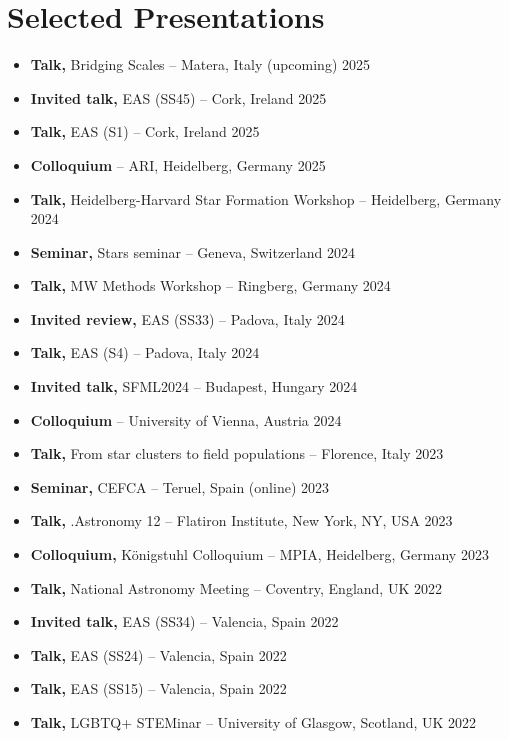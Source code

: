 \section*{Selected Presentations}

\begin{itemize}
    \item \textbf{Talk,} Bridging Scales -- Matera, Italy \hfill (upcoming) 2025
    \item \textbf{Invited talk,} EAS (SS45) -- Cork, Ireland \hfill 2025
    \item \textbf{Talk,} EAS (S1) -- Cork, Ireland \hfill 2025
    \item \textbf{Colloquium} -- ARI, Heidelberg, Germany \hfill 2025
    \item \textbf{Talk,} Heidelberg-Harvard Star Formation Workshop -- Heidelberg, Germany \hfill 2024
    \item \textbf{Seminar,} Stars seminar -- Geneva, Switzerland \hfill 2024
    \item \textbf{Talk,} MW Methods Workshop -- Ringberg, Germany \hfill 2024
    \item \textbf{Invited review,} EAS (SS33) -- Padova, Italy \hfill 2024
    \item \textbf{Talk,} EAS (S4) -- Padova, Italy \hfill 2024
    \item \textbf{Invited talk,} SFML2024 -- Budapest, Hungary \hfill 2024
    \item \textbf{Colloquium}  -- University of Vienna, Austria \hfill 2024
    \item \textbf{Talk,} From star clusters to field populations -- Florence, Italy \hfill 2023
    \item \textbf{Seminar,} CEFCA -- Teruel, Spain (online) \hfill 2023
    \item \textbf{Talk,} .Astronomy 12 -- Flatiron Institute, New York, NY, USA \hfill 2023
    \item \textbf{Colloquium,} Königstuhl Colloquium -- MPIA, Heidelberg, Germany \hfill 2023
    \item \textbf{Talk,} National Astronomy Meeting -- Coventry, England, UK \hfill 2022
    \item \textbf{Invited talk,} EAS (SS34) -- Valencia, Spain \hfill 2022
    \item \textbf{Talk,} EAS (SS24) -- Valencia, Spain \hfill 2022
    \item \textbf{Talk,} EAS (SS15) -- Valencia, Spain \hfill 2022
    \item \textbf{Talk,} LGBTQ+ STEMinar  -- University of Glasgow, Scotland, UK \hfill 2022

\end{itemize}
